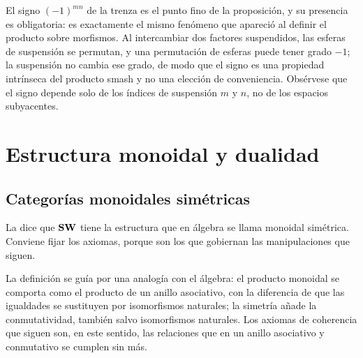 El signo $(-1)^{mn}$ de la trenza es el punto fino de la proposición, y su presencia es obligatoria: es exactamente el mismo fenómeno que apareció al definir el producto sobre morfismos. Al intercambiar dos factores suspendidos, las esferas de suspensión se permutan, y una permutación de esferas puede tener grado $-1$; la suspensión no cambia ese grado, de modo que el signo es una propiedad intrínseca del producto smash y no una elección de conveniencia. Obsérvese que el signo depende solo de los índices de suspensión $m$ y $n$, no de los espacios subyacentes.

\section{Estructura monoidal y dualidad}

\subsection{Categorías monoidales simétricas}

La  dice que $\mathbf{SW}$ tiene la estructura que en álgebra se llama monoidal simétrica. Conviene fijar los axiomas, porque son los que gobiernan las manipulaciones que siguen.

La definición se guía por una analogía con el álgebra: el producto monoidal se comporta como el producto de un anillo asociativo, con la diferencia de que las igualdades se sustituyen por isomorfismos naturales; la simetría añade la conmutatividad, también salvo isomorfismos naturales. Los axiomas de coherencia que siguen son, en este sentido, las relaciones que en un anillo asociativo y conmutativo se cumplen sin más.

